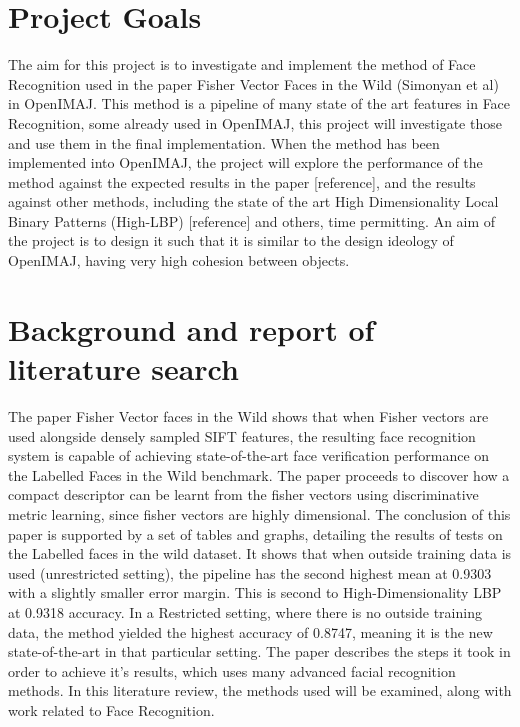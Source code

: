 \documentclass[12pt, a4paper]{article}
\begin{document}
       
        \tableofcontents
       
 
 
        \newpage
 \section*{Project Goals}
The aim for this project is to investigate and implement the method of Face Recognition used in the paper Fisher Vector Faces in the Wild (Simonyan et al) in OpenIMAJ. This method is a pipeline of many state of the art features in Face Recognition, some already used in OpenIMAJ, this project will investigate those and use them in the final implementation. When the method has been implemented into OpenIMAJ, the project will explore the performance of the method against the expected results in the paper [reference], and the results against other methods, including the state of the art High Dimensionality Local Binary Patterns (High-LBP) [reference] and others, time permitting. An aim of the project is to design it such that it is similar to the design ideology of OpenIMAJ, having very high cohesion between objects.

\newpage
\section*{Background and report of literature search}
The paper Fisher Vector faces in the Wild \cite{simonyan2004fisher} shows that when Fisher vectors are used alongside densely sampled SIFT features, the resulting face recognition system is capable of achieving state-of-the-art face verification performance on the Labelled Faces in the Wild \cite{labelledFaces} benchmark. The paper proceeds to discover how a compact descriptor can be learnt from the fisher vectors using discriminative metric learning, since fisher vectors are highly dimensional. The conclusion of this paper is supported by a set of tables and graphs, detailing the results of tests on the Labelled faces in the wild dataset. It shows that when outside training data is used (unrestricted setting), the pipeline has the second highest mean at 0.9303 with a slightly smaller error margin. This is second to High-Dimensionality LBP at 0.9318 accuracy. In a Restricted setting, where there is no outside training data, the method yielded the highest accuracy of 0.8747, meaning it is the new state-of-the-art in that particular setting. The paper describes the steps it took in order to achieve it’s results, which uses many advanced facial recognition methods. In this literature review, the methods used will be examined, along with work related to Face Recognition.
\end{document}
